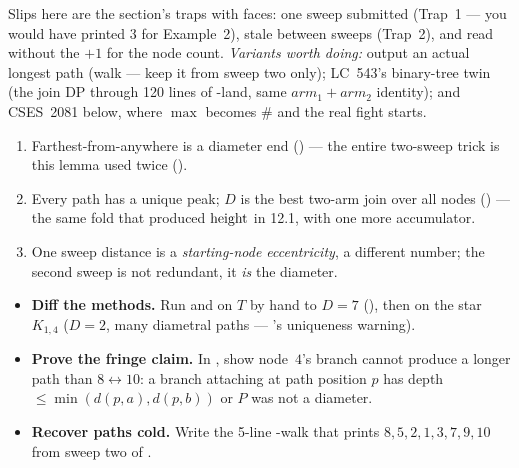 \begin{warningbox}
Slips here are the section's traps with faces: one sweep submitted (Trap~1 --- you would
have printed $3$ for Example~2), stale  between sweeps (Trap~2), and
 read without the $+1$ for the node count. \emph{Variants worth
doing:} output an actual longest path (walk  --- keep it from sweep two only);
LC~543's binary-tree twin (the join DP through 120 lines of -land, same
$\mathit{arm}_1+\mathit{arm}_2$ identity); and CSES~2081 below, where $\max$ becomes
$\#$ and the real fight starts.
\end{warningbox}

\begin{insightbox}
\begin{enumerate}[nosep, leftmargin=1.6em]
  \item Farthest-from-anywhere is a diameter end () --- the entire
        two-sweep trick is this lemma used twice ().
  \item Every path has a unique peak; $D$ is the best two-arm join over all nodes
        () --- the same fold that produced $\operatorname{height}$ in 12.1, with one
        more accumulator.
  \item One sweep distance is a \emph{starting-node eccentricity}, a different number;
        the second sweep is not redundant, it \emph{is} the diameter.
\end{enumerate}
\end{insightbox}

\begin{hardeningbox}
\begin{itemize}[nosep, leftmargin=1.4em]
  \item \textbf{Diff the methods.} Run  and  on $T$
        by hand to $D=7$ (), then on the star $K_{1,4}$ ($D=2$, many
        diametral paths --- 's uniqueness warning).
  \item \textbf{Prove the fringe claim.} In , show node~$4$'s branch
        cannot produce a longer path than $8\!\leftrightarrow\!10$: a branch attaching at
        path position $p$ has depth $\le \min(d(p,a), d(p,b))$ or $P$ was not a diameter.
  \item \textbf{Recover paths cold.} Write the 5-line -walk that prints
        $8,5,2,1,3,7,9,10$ from sweep two of .
\end{itemize}
\end{hardeningbox}

